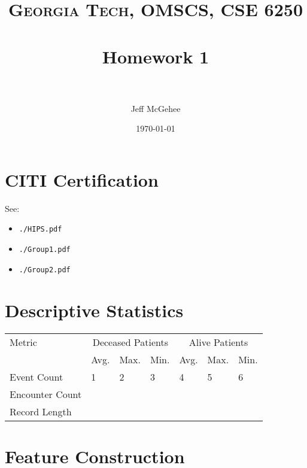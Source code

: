 \documentclass[paper=a4, fontsize=11pt]{scrartcl} %
\title{
\normalfont \normalsize
\textsc{Georgia Tech, OMSCS, CSE 6250} \\ [25pt] %
\horrule{0.5pt} \\[0.4cm] %
\huge Homework 1 \\ %
\horrule{2pt} \\[0.5cm] %
}
\author{Jeff McGehee} %
\date{\normalsize\today} %
\numberwithin{equation}{section} %
\numberwithin{figure}{section} %
\numberwithin{table}{section} %
\begin{document}
\maketitle %


\section{CITI Certification}

See:
\begin{itemize}
  \item \verb|./HIPS.pdf|
  \item \verb|./Group1.pdf|
  \item \verb|./Group2.pdf|
\end{itemize}


\section{Descriptive Statistics}
\begin{center}
    \begin{tabular}{ | l | l | l | l | l | l | l |}
    \hline
    Metric & \multicolumn{3}{c|}{Deceased Patients} & \multicolumn{3}{c|}{Alive Patients} \\ \cline{2-7}
    & Avg. & Max. & Min. & Avg. & Max. & Min. \\ \hline
    Event Count & 1 & 2 & 3 & 4 & 5 & 6 \\ \hline
    Encounter Count &  &  &  &  &  &  \\ \hline
    Record Length &  &  &  &  &  &   \\ \hline
    \end{tabular}
\end{center}




\section{Feature Construction}
\end{document}
